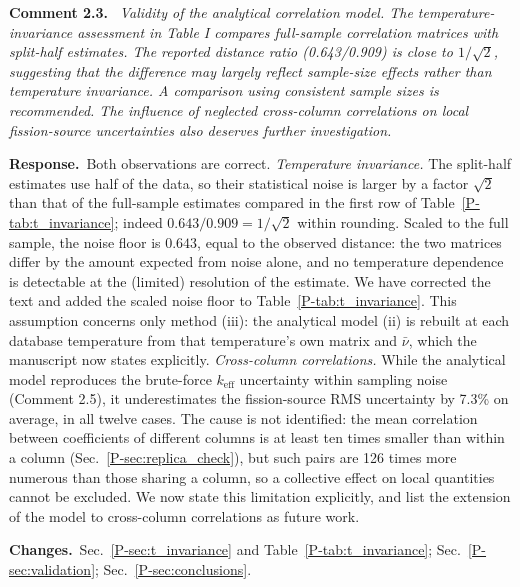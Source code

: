 \documentclass[11pt]{article}
\newenvironment{revcomment}[1]
  {\par\medskip\noindent\textbf{Comment #1.}\ \itshape}
  {\par}
\newcommand{\response}{\par\noindent\textbf{Response.}\ }
\newcommand{\changes}{\par\noindent\textbf{Changes.}\ }
\begin{document}
\begin{revcomment}{2.3}
Validity of the analytical correlation model. The temperature-invariance assessment in Table I compares full-sample correlation matrices with split-half estimates. The reported distance ratio (0.643/0.909) is close to $1/\sqrt{2}$, suggesting that the difference may largely reflect sample-size effects rather than temperature invariance. A comparison using consistent sample sizes is recommended. The influence of neglected cross-column correlations on local fission-source uncertainties also deserves further investigation.
\end{revcomment}
\response Both observations are correct.
\emph{Temperature invariance.} The split-half estimates use half of the data, so their statistical noise is larger by a factor $\sqrt{2}$ than that of the full-sample estimates compared in the first row of Table~\ref{P-tab:t_invariance}; indeed $0.643/0.909=1/\sqrt{2}$ within rounding. Scaled to the full sample, the noise floor is $0.643$, equal to the observed distance: the two matrices differ by the amount expected from noise alone, and no temperature dependence is detectable at the (limited) resolution of the estimate. We have corrected the text and added the scaled noise floor to Table~\ref{P-tab:t_invariance}. This assumption concerns only method (iii): the analytical model (ii) is rebuilt at each database temperature from that temperature's own matrix and $\bar\nu$, which the manuscript now states explicitly.
\emph{Cross-column correlations.} While the analytical model reproduces the brute-force $k_{\text{eff}}$ uncertainty within sampling noise (Comment 2.5), it underestimates the fission-source RMS uncertainty by 7.3\% on average, in all twelve cases. The cause is not identified: the mean correlation between coefficients of different columns is at least ten times smaller than within a column (Sec.~\ref{P-sec:replica_check}), but such pairs are 126 times more numerous than those sharing a column, so a collective effect on local quantities cannot be excluded. We now state this limitation explicitly, and list the extension of the model to cross-column correlations as future work.
\changes Sec.~\ref{P-sec:t_invariance} and Table~\ref{P-tab:t_invariance}; Sec.~\ref{P-sec:validation}; Sec.~\ref{P-sec:conclusions}.
\end{document}
